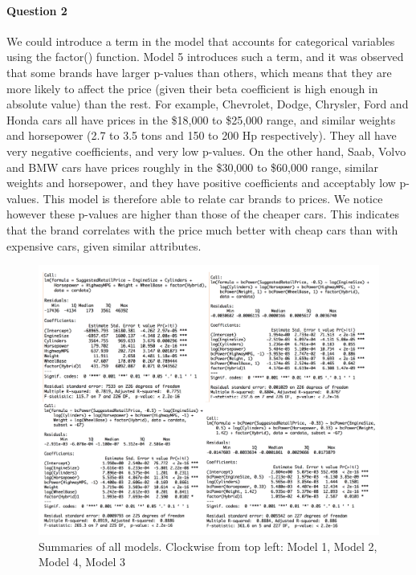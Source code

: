 \documentclass{article}
\begin{document}
\paragraph{Question 2}
We could introduce a term in the model that accounts for categorical variables using the factor() function. Model 5 introduces such a term, and it was observed that some brands have larger p-values than others, which means that they are more likely to affect the price (given their beta coefficient is high enough in absolute value) than the rest. For example, Chevrolet, Dodge, Chrysler, Ford and Honda cars all have prices in the \$18,000 to \$25,000 range, and similar weights and horsepower (2.7 to 3.5 tons and 150 to 200 Hp respectively). They all have very negative coefficients, and very low p-values. On the other hand, Saab, Volvo and BMW cars have prices roughly in the \$30,000 to \$60,000 range, similar weights and horsepower, and they have positive coefficients and acceptably low p-values. This model is therefore able to relate car brands to prices. We notice however these p-values are higher than those of the cheaper cars. This indicates that the brand correlates with the price much better with cheap cars than with expensive cars, given similar attributes. 


\begin{figure}[h!]				
	\centering
	\includegraphics[width=12cm]{Part1_summary_allmodels}
	\caption{Summaries of all models. Clockwise from top left: Model 1, Model 2, Model 4, Model 3}
\end{figure}
\end{document}
